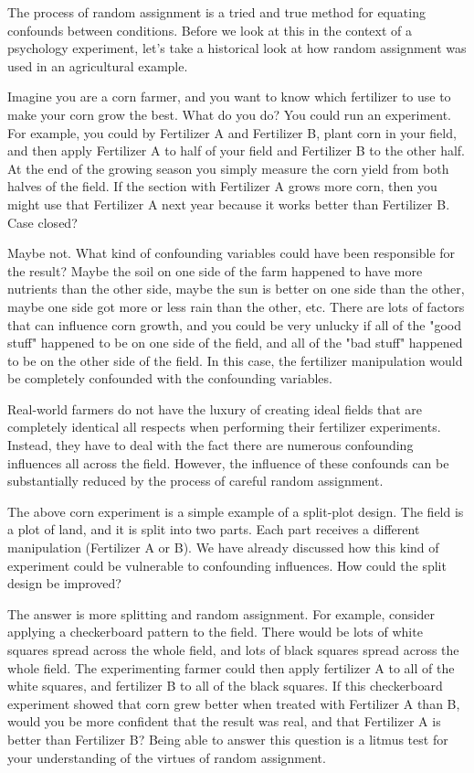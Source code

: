 The process of random assignment is a tried and true method for equating confounds between conditions. Before we look at this in the context of a psychology experiment, let's take a historical look at how random assignment was used in an agricultural example.

Imagine you are a corn farmer, and you want to know which fertilizer to use to make your corn grow the best. What do you do? You could run an experiment. For example, you could by Fertilizer A and Fertilizer B, plant corn in your field, and then apply Fertilizer A to half of your field and Fertilizer B to the other half. At the end of the growing season you simply measure the corn yield from both halves of the field. If the section with Fertilizer A grows more corn, then you might use that Fertilizer A next year because it works better than Fertilizer B. Case closed?

Maybe not. What kind of confounding variables could have been responsible for the result? Maybe the soil on one side of the farm happened to have more nutrients than the other side, maybe the sun is better on one side than the other, maybe one side got more or less rain than the other, etc. There are lots of factors that can influence corn growth, and you could be very unlucky if all of the "good stuff" happened to be on one side of the field, and all of the "bad stuff" happened to be on the other side of the field. In this case, the fertilizer manipulation would be completely confounded with the confounding variables.

Real-world farmers do not have the luxury of creating ideal fields that are completely identical all respects when performing their fertilizer experiments. Instead, they have to deal with the fact there are numerous confounding influences all across the field. However, the influence of these confounds can be substantially reduced by the process of careful random assignment.

The above corn experiment is a simple example of a split-plot design. The field is a plot of land, and it is split into two parts. Each part receives a different manipulation (Fertilizer A or B). We have already discussed how this kind of experiment could be vulnerable to confounding influences. How could the split design be improved?

The answer is more splitting and random assignment. For example, consider applying a checkerboard pattern to the field. There would be lots of white squares spread across the whole field, and lots of black squares spread across the whole field. The experimenting farmer could then apply fertilizer A to all of the white squares, and fertilizer B to all of the black squares. If this checkerboard experiment showed that corn grew better when treated with Fertilizer A than B, would you be more confident that the result was real, and that Fertilizer A is better than Fertilizer B? Being able to answer this question is a litmus test for your understanding of the virtues of random assignment. 

